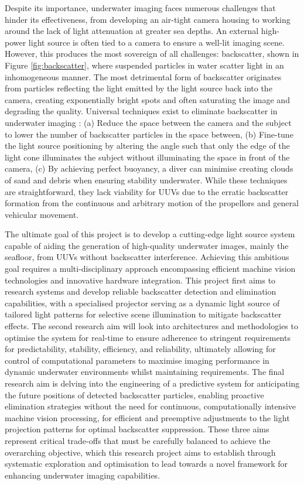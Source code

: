 Despite its importance, underwater imaging faces numerous challenges that hinder its effectiveness, from developing an air-tight camera housing to working around the lack of light attenuation at greater sea depths. An external high-power light source is often tied to a camera to ensure a well-lit imaging scene. However, this produces the most sovereign of all challenges: backscatter, shown in Figure \ref{fig:backscatter}, where suspended particles in water scatter light in an inhomogeneous manner. The most detrimental form of backscatter originates from particles reflecting the light emitted by the light source back into the camera, creating exponentially bright spots and often saturating the image and degrading the quality. Universal techniques exist to eliminate backscatter in underwater imaging \cite{brentdurandEasyWaysEliminate2013}: (a) Reduce the space between the camera and the subject to lower the number of backscatter particles in the space between, (b) Fine-tune the light source positioning by altering the angle such that only the edge of the light cone illuminates the subject without illuminating the space in front of the camera, (c) By achieving perfect buoyancy, a diver can minimise creating clouds of sand and debris when ensuring stability underwater. While these techniques are straightforward, they lack viability for UUVs due to the erratic backscatter formation from the continuous and arbitrary motion of the propellors and general vehicular movement.

The ultimate goal of this project is to develop a cutting-edge light source system capable of aiding the generation of high-quality underwater images, mainly the seafloor, from UUVs without backscatter interference. Achieving this ambitious goal requires a multi-disciplinary approach encompassing efficient machine vision technologies and innovative hardware integration. This project first aims to research systems and develop reliable backscatter detection and elimination capabilities, with a specialised projector serving as a dynamic light source of tailored light patterns for selective scene illumination to mitigate backscatter effects. The second research aim will look into architectures and methodologies to optimise the system for real-time to ensure adherence to stringent requirements for predictability, stability, efficiency, and reliability, ultimately allowing for control of computational parameters to maximise imaging performance in dynamic underwater environments whilst maintaining requirements. The final research aim is delving into the engineering of a predictive system for anticipating the future positions of detected backscatter particles, enabling proactive elimination strategies without the need for continuous, computationally intensive machine vision processing, for efficient and preemptive adjustments to the light projection patterns for optimal backscatter suppression. These three aims represent critical trade-offs that must be carefully balanced to achieve the overarching objective, which this research project aims to establish through systematic exploration and optimisation to lead towards a novel framework for enhancing underwater imaging capabilities.
